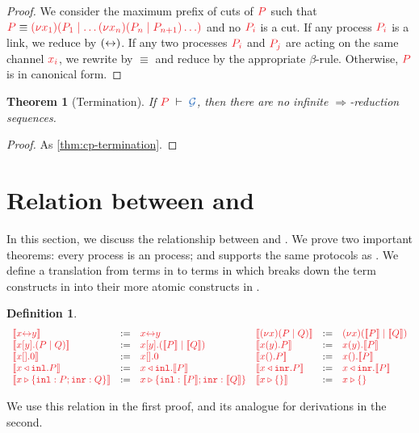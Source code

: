 \documentclass[submission,copyright,creativecommons]{eptcs}
\def\coloneqq{\mathbin{:=}}
\newtheorem{theorem}[lemma]{Theorem}
\newtheorem{definition}[lemma]{Definition}
\begin{document}
\begin{proof}
  We consider the maximum prefix of cuts of $\tm{P}$ such that $\tm{P} \equiv \tm{\cpCut{x_1}{P_1}{\dots\cpCut{x_n}{P_n}{P_{n+1}}\dots}}$ and no $\tm{P_i}$ is a cut. If any process $\tm{P_i}$ is a link, we reduce by $({\leftrightarrow})$. If any two processes $\tm{P_i}$ and $\tm{P_j}$ are acting on the same channel $\tm{x_i}$, we rewrite by $\equiv$ and reduce by the appropriate $\beta$-rule. Otherwise, $\tm{P}$ is in canonical form.
\end{proof}
\begin{theorem}[Termination]\label{thm:hcp-termination}
  If $\seq[P]{\mathcal{G}}$, then there are no infinite $\Longrightarrow$-reduction sequences.
\end{theorem} 
\begin{proof}
  As \cref{thm:cp-termination}.
\end{proof}



\section{Relation between \cp and \hcp}
\label{sec:cp2hcp}

In this section, we discuss the relationship between \cp and \hcp. We prove two important theorems: every \cp process is an \hcp process; and \hcp supports the same protocols as \cp. We define a translation from terms in \cp to terms in \hcp which breaks down the term constructs in \cp into their more atomic constructs in \hcp.
\begin{definition}\label{def:cp2hcp-terms}
  \[
    \begin{array}{lcllcl}
         \tm{\mtf{\cpLink{x}{y}}}
      &  \coloneqq & \tm{\cpLink{x}{y}}
      &  \tm{\mtf{\cpCut{x}{P}{Q}}}
      &  \coloneqq & \tm{\piNew{x}{(\piPar{\mtf{P}}{\mtf{Q}})}}
      \\ \tm{\mtf{\cpSend{x}{y}{P}{Q}}}
      &  \coloneqq & \tm{\piBoundSend{x}{y}{(\piPar{\mtf{P}}{\mtf{Q}})}}
      &  \tm{\mtf{\cpRecv{x}{y}{P}}}
      &  \coloneqq & \tm{\piRecv{x}{y}{\mtf{P}}}
      \\ \tm{\mtf{\cpHalt{x}}}
      &  \coloneqq & \tm{\piBoundSend{x}{}{\piHalt}}
      &  \tm{\mtf{\cpWait{x}{P}}}
      &  \coloneqq & \tm{\piRecv{x}{}{\mtf{P}}}
      \\ \tm{\mtf{\cpInl{x}{P}}}
      &  \coloneqq & \tm{\cpInl{x}{\mtf{P}}}
      &  \tm{\mtf{\cpInr{x}{P}}}
      &  \coloneqq & \tm{\cpInr{x}{\mtf{P}}}
      \\ \tm{\mtf{\cpCase{x}{P}{Q}}}
      &  \coloneqq & \tm{\cpCase{x}{\mtf{P}}{\mtf{Q}}}
      &  \tm{\mtf{\cpAbsurd{x}}}
      &  \coloneqq & \tm{\cpAbsurd{x}}
    \end{array}
  \]
\end{definition}\noindent
We use this relation in the first proof, and its analogue for derivations in the second.
\end{document}

